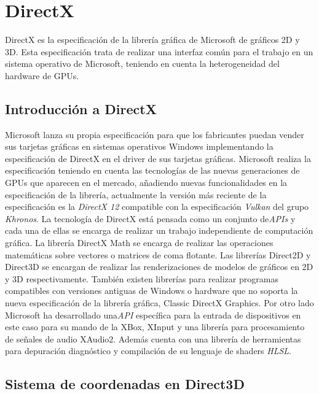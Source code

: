 \documentclass[a4paper]{book}
\begin{document}
\section{DirectX}
\label{sec:DirectX}

DirectX es la especificación de la librería gráfica de Microsoft de gráficos 2D y 3D. Esta especificación trata de realizar
una interfaz común para el trabajo en un sistema operativo de Microsoft, teniendo en cuenta la heterogeneidad del hardware de GPUs.

\subsection{Introducción a DirectX}
\label{subsec:IntroDirectX}

Microsoft lanza su propia especificación para que los fabricantes puedan vender sus tarjetas gráficas en sistemas operativos Windows
implementando la especificación de DirectX en el driver de sus tarjetas gráficas. Microsoft realiza la especificación teniendo en
cuenta las tecnologías de las nuevas generaciones de GPUs que aparecen en el mercado, añadiendo nuevas funcionalidades en la
especificación de la librería, actualmente la versión más reciente de la especificación es la \textit{DirectX 12} compatible con la
especificación \textit{Vulkan} del grupo \textit{Khronos}. La tecnología de DirectX está pensada como un conjunto de\textit{APIs} y cada
una de ellas se encarga de realizar un trabajo independiente de computación gráfica. La librería DirectX Math se encarga de realizar las
operaciones matemáticas sobre vectores o matrices de coma flotante. Las librerías Direct2D y Direct3D se encargan de realizar las renderizaciones
de modelos de gráficos en 2D y 3D respectivamente. También existen librerías para realizar programas compatibles con
versiones antiguas de Windows o hardware que no soporta la nueva especificación de la librería gráfica, Classic DirectX
Graphics. Por otro lado Microsoft ha desarrollado una\textit{API} específica para la entrada de dispositivos en este caso para su
mando de la XBox, XInput y una librería para procesamiento de señales de audio XAudio2. Además cuenta con una librería
de herramientas para depuración diagnóstico y compilación de su lenguaje de shaders \textit{HLSL}. \cite{directx:_functionalities}

\subsection{Sistema de coordenadas en Direct3D}
\label{subsec:SysDirectX}
\end{document}
